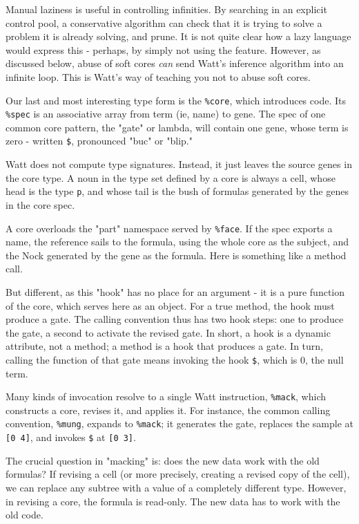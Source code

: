 \documentclass[10pt, nocopyrightspace]{sigplanconf}
\begin{document}
Manual laziness is useful in controlling infinities.  By
searching in an explicit control pool, a conservative algorithm
can check that it is trying to solve a problem it is already
solving, and prune.  It is not quite clear how a lazy language
would express this - perhaps, by simply not using the feature.
However, as discussed below, abuse of soft cores \emph{can} send
Watt's inference algorithm into an infinite loop.  This is Watt's
way of teaching you not to abuse soft cores.

Our last and most interesting type form is the \verb|%core|,
which introduces code.  Its \verb|%spec| is an associative 
array from term (ie, name) to gene.  The spec of one common core
pattern, the "gate" or lambda, will contain one gene, whose term
is zero - written \verb|$|, pronounced "buc" or "blip."

Watt does not compute type signatures.  Instead, it just leaves
the source genes in the core type.  A noun in the type set
defined by a core is always a cell, whose head is the type
\verb|p|, and whose tail is the bush of formulas generated by the
genes in the core spec.  

A core overloads the "part" namespace served by \verb|%face|.
If the spec exports a name, the reference sails to the formula, 
using the whole core as the subject, and the Nock generated by
the gene as the formula.  Here is something like a method call.  

But different, as this "hook" has no place for an argument - it
is a pure function of the core, which serves here as an object.
For a true method, the hook must produce a gate.  The calling
convention thus has two hook steps: one to produce the gate, a
second to activate the revised gate.  In short, a hook is a
dynamic attribute, not a method; a method is a hook that produces
a gate.  In turn, calling the function of that gate means
invoking the hook \verb|$|, which is 0, the null term.

Many kinds of invocation resolve to a single Watt instruction,
\verb|%mack|, which constructs a core, revises it, and applies
it.  For instance, the common calling convention, \verb|%mung|,
expands to \verb|%mack|; it generates the gate, replaces the
sample at \verb|[0 4]|, and invokes \verb|$| at \verb|[0 3]|.

The crucial question in "macking" is: does the new data work with
the old formulas?  If revising a cell (or more precisely,
creating a revised copy of the cell), we can replace any subtree
with a value of a completely different type.  However, in
revising a core, the formula is read-only.  The new data has to
work with the old code.
\end{document}
